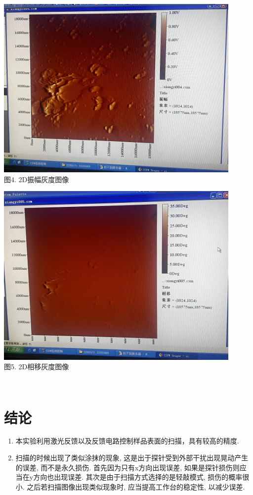 \documentclass[UTF8]{ctexart}
\begin{document}
\begin{minipage}[!ht]{0.5\linewidth}
    \centering
    \includegraphics[width=0.9\textwidth]{4.JPG}\\
    {\small{
        图4. 2D振幅灰度图像
    }}
    \vspace{10pt}
\end{minipage}
\begin{minipage}[!ht]{0.5\linewidth}
    \centering
    \includegraphics[width=0.9\textwidth]{5.JPG}\\
    {\small{
        图5. 2D相移灰度图像
    }}
    \vspace{10pt}
\end{minipage}\\
\section{结论}
\begin{enumerate}
    \item 本实验利用激光反馈以及反馈电路控制样品表面的扫描，具有较高的精度.
    \item 扫描的时候出现了类似涂抹的现象, 这是出于探针受到外部干扰出现晃动产生的误差, 而不是永久损伤. 首先因为只有x方向出现误差, 如果是探针损伤则应当在y方向也出现误差. 其次是由于扫描方式选择的是轻敲模式, 损伤的概率很小. 之后若扫描图像出现类似现象时, 应当提高工作台的稳定性, 以减少误差.
\end{enumerate}
\end{document}
